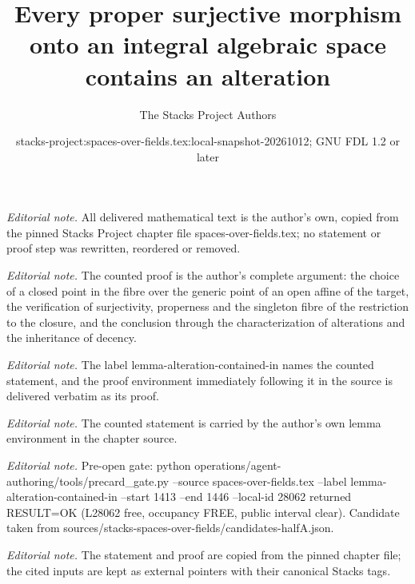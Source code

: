 \documentclass[10pt,a4paper]{amsart}
\title{Every proper surjective morphism onto an integral algebraic space contains an alteration}
\author{The Stacks Project Authors}
\date{stacks-project:spaces-over-fields.tex:local-snapshot-20261012; GNU FDL 1.2 or later}
\theoremstyle{plain}
\theoremstyle{definition}
\theoremstyle{remark}
\numberwithin{equation}{subsection}
\begin{document}
\maketitle
\noindent\textit{Editorial note.} All delivered mathematical text is the author's own, copied from the pinned Stacks Project chapter file spaces-over-fields.tex; no statement or proof step was rewritten, reordered or removed.\par\medskip
\noindent\textit{Editorial note.} The counted proof is the author's complete argument: the choice of a closed point in the fibre over the generic point of an open affine of the target, the verification of surjectivity, properness and the singleton fibre of the restriction to the closure, and the conclusion through the characterization of alterations and the inheritance of decency.\par\medskip
\noindent\textit{Editorial note.} The label lemma-alteration-contained-in names the counted statement, and the proof environment immediately following it in the source is delivered verbatim as its proof.\par\medskip
\noindent\textit{Editorial note.} The counted statement is carried by the author's own lemma environment in the chapter source.\par\medskip
\noindent\textit{Editorial note.} Pre-open gate: python operations/agent-authoring/tools/precard\_gate.py --source spaces-over-fields.tex --label lemma-alteration-contained-in --start 1413 --end 1446 --local-id 28062 returned RESULT=OK (L28062 free, occupancy FREE, public interval clear). Candidate taken from sources/stacks-spaces-over-fields/candidates-halfA.json.\par\medskip
\noindent\textit{Editorial note.} The statement and proof are copied from the pinned chapter file; the cited inputs are kept as external pointers with their canonical Stacks tags.\par\medskip
\end{document}
